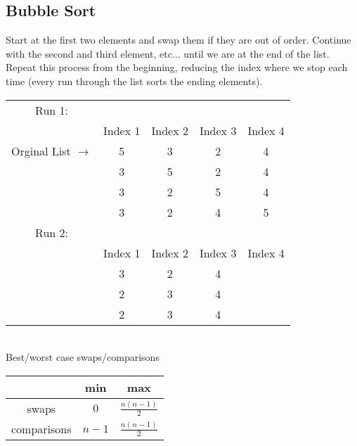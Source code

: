 \documentclass{article}
\begin{document}
\begin{spacing}{1.5}
\subsection{Bubble Sort}
\label{sec:bubblesort}
Start at the first two elements and swap them if they are out of order. Continue with the second and third element, etc... until we are at the end of the list. Repeat this process from the beginning, reducing the index where we stop each time (every run through the list sorts the ending elements).\\
\begin{tabular}{c c|c|c|c}
    Run 1:\\
     & Index 1 & Index 2 & Index 3 & Index 4\\
         \hline
    Orginal List $\rightarrow$ & 5 & 3 & 2 & 4 \\
    & 3 & 5 & 2 & 4 \\
    & 3 & 2 & 5 & 4 \\
    & 3 & 2 & 4 & 5 \\
    Run 2:\\
    & Index 1 & Index 2 & Index 3 & Index 4\\
         \hline
    & 3 & 2 & 4 & \color{green}{5} \\
    & 2 & 3 & 4 & \color{green}{5} \\
    & 2 & 3 & 4 & \color{green}{5} \\
\end{tabular}\\
Best/worst case swaps/comparisons\\
\begin{tabular}{c|c|c}
     & min & max \\
     \hline
    swaps &  $0$ & $\frac{n(n-1)}{2}$ \\
    comparisons & $n-1$ &  $\frac{n(n-1)}{2}$
\end{tabular}


\end{spacing}
\end{document}
